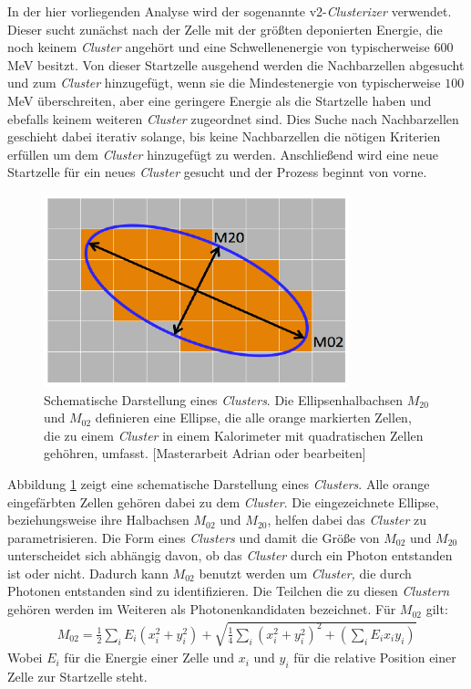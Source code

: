 In der hier vorliegenden Analyse wird der sogenannte v2-\textit{Clusterizer} verwendet.
Dieser sucht zun\"achst nach der Zelle mit der gr\"o{\ss}ten deponierten Energie, die noch keinem \textit{Cluster} angeh\"ort und eine Schwellenenergie von typischerweise $600$ MeV besitzt.
Von dieser Startzelle ausgehend werden die Nachbarzellen abgesucht und zum \textit{Cluster} hinzugef\"ugt, wenn sie die Mindestenergie von typischerweise $100$ MeV \"uberschreiten, aber eine geringere Energie als die Startzelle haben und ebefalls keinem weiteren \textit{Cluster} zugeordnet sind.
Dies Suche nach Nachbarzellen geschieht dabei iterativ solange, bis keine Nachbarzellen die n\"otigen Kriterien erf\"ullen um dem \textit{Cluster} hinzugef\"ugt zu werden.
Anschlie{\ss}end wird eine neue Startzelle f\"ur ein neues \textit{Cluster} gesucht und der Prozess beginnt von vorne.

\begin{figure}[thp]
\centering
\includegraphics[width=.35\linewidth]{m02&m20.png}
\caption{Schematische Darstellung eines \textit{Clusters}. Die Ellipsenhalbachsen $M_{20}$ und $M_{02}$ definieren eine Ellipse, die alle orange markierten Zellen, die zu einem \textit{Cluster} in einem Kalorimeter mit quadratischen Zellen geh\"ohren, umfasst.
[Masterarbeit Adrian oder bearbeiten]}
\label{fig:$M_{20}$}
\end{figure}

Abbildung \ref{fig:$M_{20}$} zeigt eine schematische Darstellung eines \textit{Clusters}.
Alle orange eingef\"arbten Zellen geh\"oren dabei zu dem \textit{Cluster}.
Die eingezeichnete Ellipse, beziehungsweise ihre Halbachsen $M_{02}$ und $M_{20}$, helfen dabei das \textit{Cluster} zu parametrisieren.
Die Form eines \textit{Clusters} und damit die Gr\"o{\ss}e von $M_{02}$ und $M_{20}$ unterscheidet sich abh\"angig davon, ob das \textit{Cluster} durch ein Photon entstanden ist oder nicht.
Dadurch kann $M_{02}$ benutzt werden um \textit{Cluster,} die durch Photonen entstanden sind zu identifizieren.
Die Teilchen die zu diesen \textit{Clustern} geh\"oren werden im Weiteren als Photonenkandidaten bezeichnet.
F\"ur $M_{02}$ gilt:
\begin{align} 
M_{02} = \frac{1}{2}\sum_{i}E_{i}(x_{i}^{2}+y_{i}^{2})+\sqrt{\frac{1}{4}\sum_{i}\left(x_{i}^{2}+y_{i}^{2}\right)^{2}+\left(\sum_{i}E_{i}x_{i}y_{i}\right)}
\end{align}
Wobei $E_{i}$ f\"ur die Energie einer Zelle und $x_{i}$ und $y_{i}$ f\"ur die relative Position einer Zelle zur Startzelle steht.